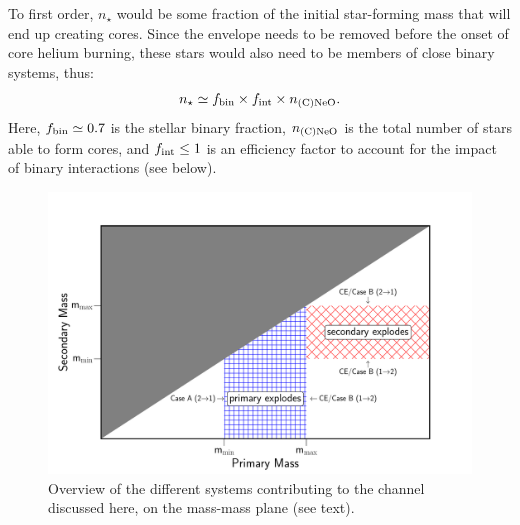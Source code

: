 \documentclass[../../main/thesis_msc.tex]{subfiles}
\begin{document}
To first order, $n_\star$ would be some fraction of the initial star-forming mass that will end up creating    \one cores. Since the  envelope needs to be removed before the onset of core helium burning, these stars would also need to be members of close  binary systems, thus:  
\begin{equation}
n_{\star} \simeq  f_{\rm bin} \times f_{\rm int} \times  n_{\rm \one}.
\end{equation}
Here, $f_{\rm bin}\simeq 0.7$ \citep{Sana:2012px} is the stellar binary fraction,   $n_{\rm \one}$ is the total 
number of stars able to form \one cores, and $f_{\rm int}\leq 1$ is an efficiency factor to account for the impact of binary interactions (see below).
\begin{figure}[htb!]
\begin{center}
\includegraphics[width=1\textwidth]{../figures/chapter3/rates.pdf}
\caption{Overview of the different systems contributing to the \ia channel discussed here, on the mass-mass plane (see text).}
\label{fig:rates}
\end{center}
\end{figure}
\end{document}
